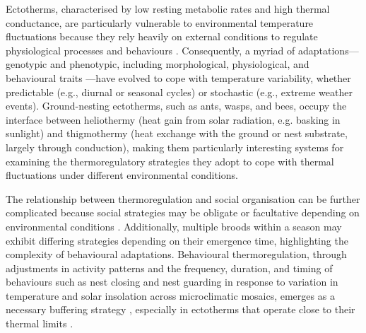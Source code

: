 \documentclass[11pt,a4paper]{article}
\begin{document}
Ectotherms, characterised by low resting metabolic rates and high thermal conductance, are particularly vulnerable to environmental temperature fluctuations because they rely heavily on external conditions to regulate physiological processes and behaviours \citep{Cossins2012}. Consequently, a myriad of adaptations—genotypic and phenotypic, including morphological, physiological, and behavioural traits \citep{Bale2002, Dunham1993, Helmuth2005}—have evolved to cope with temperature variability, whether predictable (e.g., diurnal or seasonal cycles) or stochastic (e.g., extreme weather events). Ground-nesting ectotherms, such as ants, wasps, and bees, occupy the interface between heliothermy (heat gain from solar radiation, e.g. basking in sunlight) and thigmothermy (heat exchange with the ground or nest substrate, largely through conduction), making them particularly interesting systems for examining the thermoregulatory strategies they adopt to cope with thermal fluctuations under different environmental conditions. 

The relationship between thermoregulation and social organisation can be further complicated because social strategies may be obligate or facultative depending on environmental conditions \citep{Soucy2002, Richards2003}. Additionally, multiple broods within a season may exhibit differing strategies depending on their emergence time, highlighting the complexity of behavioural adaptations. Behavioural thermoregulation, through adjustments in activity patterns and the frequency, duration, and timing of behaviours such as nest closing and nest guarding in response to variation in temperature and solar insolation across microclimatic mosaics, emerges as a necessary buffering strategy \citep{Kearney2009, Bogert1949, Bartholomew1964}, especially in ectotherms that operate close to their thermal limits \citep{HueyStevenson1979, Kearney2009}. 
\end{document}

